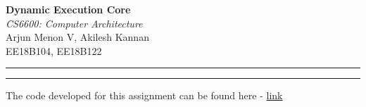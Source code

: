\documentclass[12pt,a4paper,english]{paper}
\def \courseNumber {CS6600}
\def \courseName {Computer Architecture}
\def \assignmentName {Dynamic Execution Core}
\def \myName {Arjun Menon V, Akilesh Kannan}
\def \rollNumber {EE18B104, EE18B122}
\newenvironment{warning}{%
  \def\FrameCommand{%
    \hspace{1pt}%
    {\color{red}\vrule width 2pt}%
    {\color{formalred}\vrule width 4pt}%
    \colorbox{formalred}%
  }%
  \MakeFramed{\advance\hsize-\width\FrameRestore}%
  \noindent\hspace{-4.55pt}%
  \begin{adjustwidth}{7pt}{}%
  \vspace{2pt}\vspace{2pt}%
}
{%
  \vspace{2pt}\end{adjustwidth}\endMakeFramed%
}
\begin{document}
 
\thispagestyle{empty}
\vspace{-4.5cm}

\hspace*{-\parindent}
\begin{minipage}{0.65\textwidth}
\fontsize{22pt}{10pt}\selectfont\textbf{\assignmentName}\\[1mm]
\Large
\textit{\courseNumber: \courseName}\\[5mm]
\Large \myName \\[1mm]
\normalsize \rollNumber \\
\end{minipage}\hfill%

\hrule \hrule
\medskip

\begin{warning}
The code developed for this assignment can be found here - \href{https://github.com/aklsh/DynamicExecCore}{link}
\end{warning}
\end{document}
